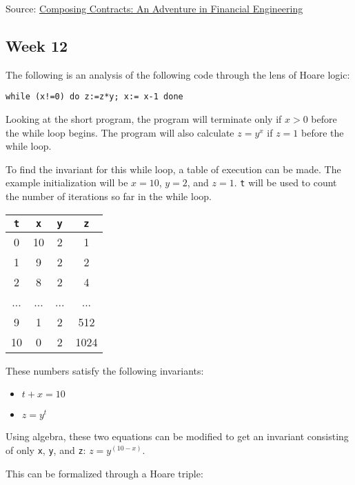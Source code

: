 \documentclass{article}
\theoremstyle{theorem}
\theoremstyle{definition}
\theoremstyle{remark}
\begin{document}
Source: 
\href{https://www.cs.tufts.edu/~nr/cs257/archive/simon-peyton-jones/contracts.pdf}{Composing Contracts: An Adventure in Financial Engineering}

\newpage

\subsection{Week 12}

The following is an analysis of the following code through the lens of Hoare logic:

\texttt{while (x!=0) do z:=z*y;  x:= x-1 done}

Looking at the short program, the program will terminate only if $x > 0$ before the while loop begins. The program will also calculate $z = y^x$ if $z = 1$ before the while loop.

To find the invariant for this while loop, a table of execution can be made. The example initialization will be $x = 10$, $y = 2$, and $z = 1$. \texttt{t} will be used to count the number of iterations so far in the while loop.

\begin{center}
\begin{tabular}{ | c | c | c | c| }
    \hline
    \texttt{t} & \texttt{x} & \texttt{y} & \texttt{z} \\
    \hline\hline
    0 & 10 & 2 & 1 \\ 
    \hline
    1 & 9 & 2 & 2 \\
    \hline
    2 & 8 & 2 & 4 \\
    \hline
    ... & ... & ... & ... \\
    \hline
    9 & 1 & 2 & 512 \\
    \hline
    10 & 0 & 2 & 1024 \\
    \hline
\end{tabular}
\end{center}

These numbers satisfy the following invariants:

\begin{itemize}
    \item $t + x = 10$
    \item $z = y ^ t$
\end{itemize}

Using algebra, these two equations can be modified to get an invariant consisting of only \texttt{x}, \texttt{y}, and \texttt{z}: $z = y^{(10 - x)}$.

This can be formalized through a Hoare triple:
\end{document}
